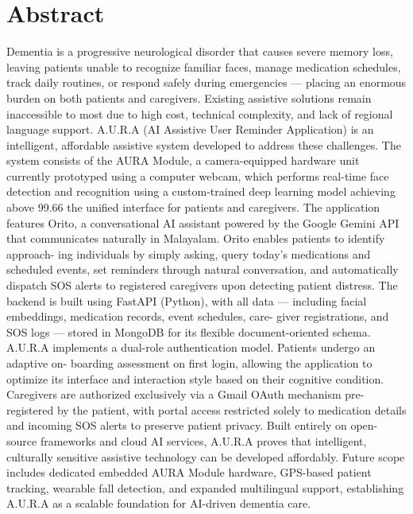 
\chapter*{\centering Abstract}
%

Dementia is a progressive neurological disorder that causes severe memory loss, leaving
patients unable to recognize familiar faces, manage medication schedules, track daily
routines, or respond safely during emergencies — placing an enormous burden on both
patients and caregivers. Existing assistive solutions remain inaccessible to most due to high
cost, technical complexity, and lack of regional language support.
A.U.R.A (AI Assistive User Reminder Application) is an intelligent, affordable assistive
system developed to address these challenges. The system consists of the AURA Module,
a camera-equipped hardware unit currently prototyped using a computer webcam, which
performs real-time face detection and recognition using a custom-trained deep learning
model achieving above 99.66%
the unified interface for patients and caregivers.
The application features Orito, a conversational AI assistant powered by the Google Gemini
API that communicates naturally in Malayalam. Orito enables patients to identify approach-
ing individuals by simply asking, query today’s medications and scheduled events, set
reminders through natural conversation, and automatically dispatch SOS alerts to registered
caregivers upon detecting patient distress. The backend is built using FastAPI (Python),
with all data — including facial embeddings, medication records, event schedules, care-
giver registrations, and SOS logs — stored in MongoDB for its flexible document-oriented
schema.
A.U.R.A implements a dual-role authentication model. Patients undergo an adaptive on-
boarding assessment on first login, allowing the application to optimize its interface and
interaction style based on their cognitive condition. Caregivers are authorized exclusively
via a Gmail OAuth mechanism pre-registered by the patient, with portal access restricted
solely to medication details and incoming SOS alerts to preserve patient privacy.
Built entirely on open-source frameworks and cloud AI services, A.U.R.A proves that
intelligent, culturally sensitive assistive technology can be developed affordably. Future
scope includes dedicated embedded AURA Module hardware, GPS-based patient tracking,
wearable fall detection, and expanded multilingual support, establishing A.U.R.A as a
scalable foundation for AI-driven dementia care.

